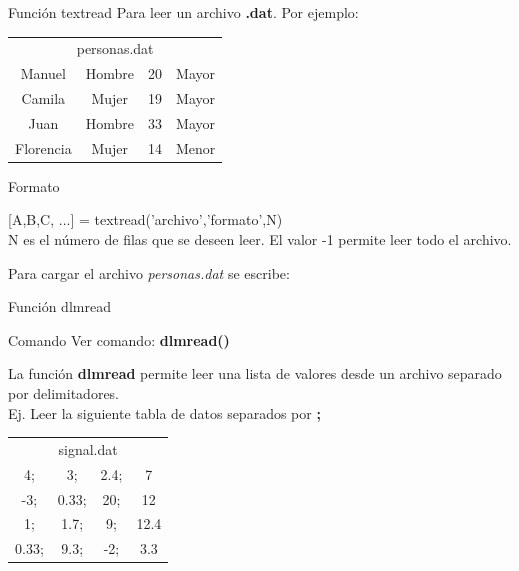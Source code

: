\documentclass{bredelebeamer}
\begin{document}
\begin{frame}{Función textread}
Para leer un archivo \textbf{.dat}. Por ejemplo:
\begin{table}[]
\centering
\begin{tabular}{cccc}
\multicolumn{4}{c}{personas.dat} \\
Manuel     & Hombre & 20 & Mayor \\
Camila     & Mujer  & 19 & Mayor \\
Juan       & Hombre & 33 & Mayor \\
Florencia  & Mujer  & 14 & Menor
\end{tabular}
\end{table}
\begin{block}{Formato}
\begin{center}
[A,B,C, ...] = textread(’archivo’,’formato’,N)\\
N es el número de filas que se deseen leer. El valor -1 permite leer todo el archivo.
\end{center}
\end{block}
Para cargar el archivo \textit{personas.dat} se escribe:\\
\end{frame}

\begin{frame}{Función dlmread}
\begin{exampleblock}{Comando}
Ver comando: \textbf{dlmread()}
\end{exampleblock}
La función \textbf{dlmread} permite leer una lista de valores desde un archivo separado por delimitadores.\\
Ej. Leer la siguiente tabla de datos separados por \textbf{;}
\begin{table}[]
\centering
\begin{tabular}{cccc}
\multicolumn{4}{c}{signal.dat} \\
4;     & 3;     & 2.4;  & 7    \\
-3;    & 0.33;  & 20;   & 12   \\
1;     & 1.7;   & 9;    & 12.4 \\
0.33;  & 9.3;   & -2;   & 3.3 
\end{tabular}
\end{table}
\end{frame}
\end{document}
